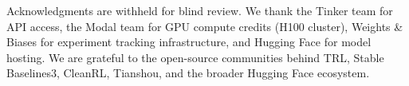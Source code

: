 \documentclass{article}
\begin{document}




\label{sec:acknowledgments}
\begin{ack}
Acknowledgments are withheld for blind review. We thank the Tinker team for
API access, the Modal team for GPU compute credits (H100 cluster), Weights
\& Biases for experiment tracking infrastructure, and Hugging Face for model
hosting. We are grateful to the open-source communities behind TRL, Stable
Baselines3, CleanRL, Tianshou, and the broader Hugging Face ecosystem.
\end{ack}




\appendix






\end{document}
